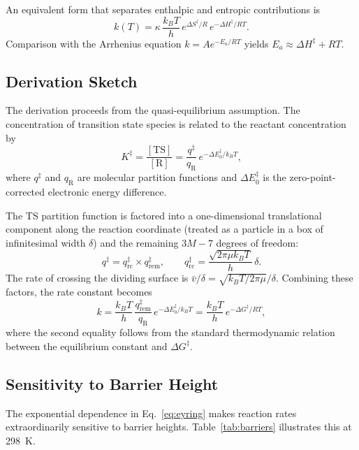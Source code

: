 \documentclass[11pt]{article}
\numberwithin{equation}{section}
\begin{document}
An equivalent form that separates enthalpic and entropic contributions is
\begin{equation}
k(T) = \kappa\,\frac{k_BT}{h}\,e^{\Delta S^\ddagger/R}\,e^{-\Delta H^\ddagger/RT}.
\label{eq:eyring_HS}
\end{equation}
Comparison with the Arrhenius equation $k = Ae^{-E_a/RT}$ yields $E_a \approx \Delta H^\ddagger + RT$.

\subsection{Derivation Sketch}

The derivation proceeds from the quasi-equilibrium assumption. The concentration of transition state species is related to the reactant concentration by
\begin{equation}
K^\ddagger = \frac{[\text{TS}]}{[\text{R}]} = \frac{q^\ddagger}{q_\text{R}}\,e^{-\Delta E_0^\ddagger/k_BT},
\end{equation}
where $q^\ddagger$ and $q_\text{R}$ are molecular partition functions and $\Delta E_0^\ddagger$ is the zero-point-corrected electronic energy difference.

The TS partition function is factored into a one-dimensional translational component along the reaction coordinate (treated as a particle in a box of infinitesimal width $\delta$) and the remaining $3M-7$ degrees of freedom:
\begin{equation}
q^\ddagger = q_\text{rc}^\ddagger \times q_\text{rem}^\ddagger, \qquad q_\text{rc}^\ddagger = \frac{\sqrt{2\pi\mu k_BT}}{h}\,\delta.
\end{equation}
The rate of crossing the dividing surface is $\bar{v}/\delta = \sqrt{k_BT/2\pi\mu}/\delta$. Combining these factors, the rate constant becomes
\begin{equation}
k = \frac{k_BT}{h}\,\frac{q_\text{rem}^\ddagger}{q_\text{R}}\,e^{-\Delta E_0^\ddagger/k_BT} = \frac{k_BT}{h}\,e^{-\Delta G^\ddagger/RT},
\end{equation}
where the second equality follows from the standard thermodynamic relation between the equilibrium constant and $\Delta G^\ddagger$.

\subsection{Sensitivity to Barrier Height}

The exponential dependence in Eq.~\eqref{eq:eyring} makes reaction rates extraordinarily sensitive to barrier heights. Table~\ref{tab:barriers} illustrates this at \SI{298}{K}.
\end{document}
